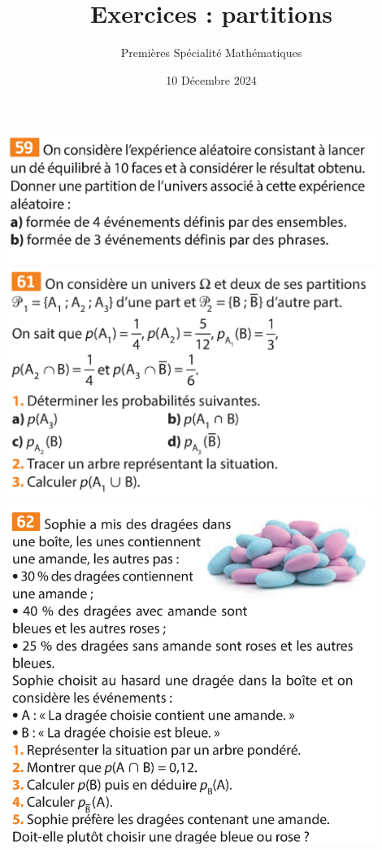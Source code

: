 \documentclass{article}
\title{Exercices : partitions}
\author{Premières Spécialité Mathématiques}
\date{10 Décembre 2024}
\begin{document}
\maketitle

\begin{center}
\includegraphics[width=0.9\textwidth]{Exercice_partition_de.png}
\includegraphics[width=0.9\textwidth]{Exercice_partition.png}
\includegraphics[width=0.9\textwidth]{Exercice_dragee.png}
\end{center}
\end{document}
